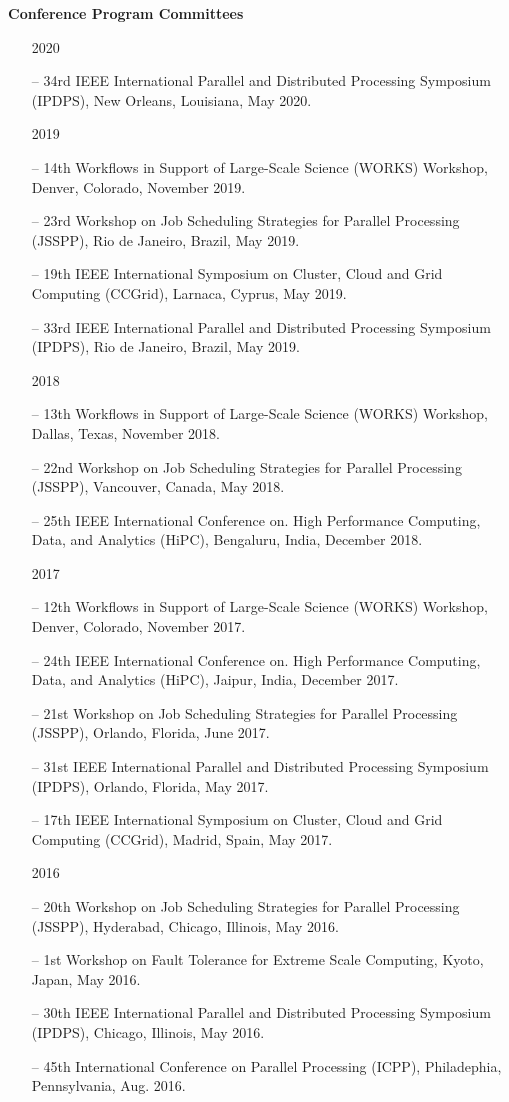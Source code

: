 \documentclass[times,11pt]{letter}
\begin{document}
\noindent
{\bf Conference Program Committees}
\begin{itemize}
\item [2020]
\item [--] 34rd IEEE International Parallel and Distributed Processing Symposium (IPDPS), New Orleans, Louisiana, May 2020.
\item [2019]
\item[--]  14th Workflows in Support of Large-Scale Science (WORKS) Workshop, Denver, Colorado, November 2019.
\item[--]  23rd Workshop on Job Scheduling Strategies for Parallel Processing (JSSPP), Rio de Janeiro, Brazil, May 2019.
\item[--]  19th IEEE International Symposium on Cluster, Cloud and Grid Computing (CCGrid), Larnaca, Cyprus, May 2019.
\item[--]  33rd IEEE International Parallel and Distributed Processing Symposium (IPDPS), Rio de Janeiro, Brazil, May 2019.

\item [2018]
\item[--]  13th Workflows in Support of Large-Scale Science (WORKS) Workshop, Dallas, Texas, November 2018.
\item[--]  22nd Workshop on Job Scheduling Strategies for Parallel Processing (JSSPP), Vancouver, Canada, May 2018.
\item[--]  25th IEEE International Conference on. High Performance Computing, Data, and Analytics (HiPC), Bengaluru, India, December 2018.

\item [2017]
\item[--]  12th Workflows in Support of Large-Scale Science (WORKS) Workshop, Denver, Colorado, November 2017.
\item[--]  24th IEEE International Conference on. High Performance Computing, Data, and Analytics (HiPC), Jaipur, India, December 2017.
\item[--]  21st Workshop on Job Scheduling Strategies for Parallel Processing (JSSPP), Orlando, Florida, June 2017.
\item[--]  31st IEEE International Parallel and Distributed Processing Symposium (IPDPS), Orlando, Florida, May 2017.
\item[--]  17th IEEE International Symposium on Cluster, Cloud and Grid Computing (CCGrid), Madrid, Spain, May 2017.

\item [2016]
\item[--]  20th Workshop on Job Scheduling Strategies for Parallel Processing (JSSPP), Hyderabad, Chicago, Illinois, May 2016.
\item[--]  1st Workshop on Fault Tolerance for Extreme Scale Computing, 
Kyoto, Japan, May 2016.
\item[--]  30th IEEE International Parallel and Distributed Processing Symposium (IPDPS), Chicago, Illinois, May 2016.
\item[--] 45th International Conference on Parallel Processing (ICPP),  Philadephia, Pennsylvania, Aug. 2016.


\end{itemize}
\end{document}

